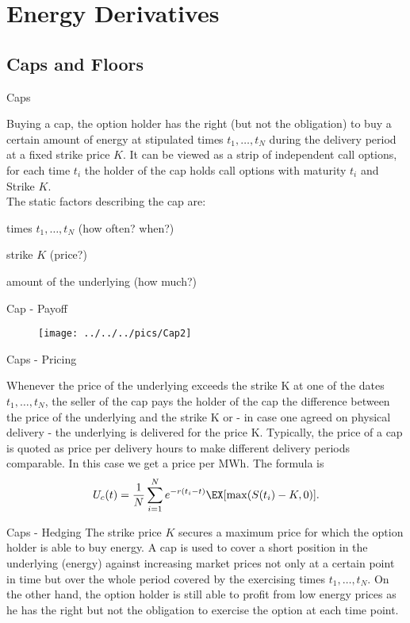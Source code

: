 \section{Energy Derivatives}
\subsection{Caps and  Floors}

{Caps}

Buying a cap, the option holder has the right (but not the
obligation) to buy a certain amount of energy at stipulated times
$t_1,\ldots,t_N$ during the delivery period at a fixed strike
price $K$. It can be viewed as a strip of
independent call options, for each time $t_i$ the holder of the cap holds call options with maturity $t_i$ and Strike $K$. \\
The static factors describing the cap are:






	times $t_1,\ldots,t_N$ (how often? when?)


	strike $K$ (price?)


	amount of the underlying (how much?)





{Cap - Payoff}
\begin{figure}
	\centering
		\texttt{[image: ../../../pics/Cap2]}
	\label{fig:Cap2}
\end{figure}

{Caps - Pricing}

Whenever the price of the underlying exceeds the strike K at one of the dates $t_1,\ldots,t_N$, the seller of the cap pays the holder of the cap the difference between the price of the underlying and the strike K or - in case one agreed on physical delivery - the underlying is delivered for the price K.
Typically, the price of a cap is quoted as price per delivery hours to make
different delivery periods comparable. In this case we get a price
per MWh. The formula is
$$U_c(t)=\frac{1}{N}\sum_{i=1}^Ne^{-r(t_i-t)}\EX[\max(S(t_i)-K,0)].$$

{Caps - Hedging}
The strike price $K$ secures a maximum price for which the option holder is able to buy energy. A cap is used to cover a short position in the underlying (energy) against
increasing market prices not only at a certain point in time but over the whole period covered by the exercising times $t_1,\ldots,t_N$.
On the other hand, the option holder is still able to profit from low energy prices as he has the right but not the obligation to exercise the option at each time point.

